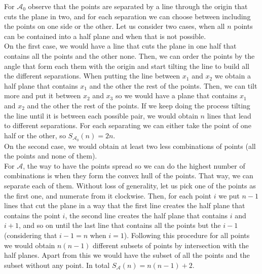 \documentclass[11pt, english]{article}
\begin{document}
For $\mathcal{A}_0$ observe that the points are separated by a line through the origin that cuts the plane in two, and for each separation we can choose between including the points on one side or the other. Let us consider two cases, when all $n$ points can be contained into a half plane and when that is not possible.\\

On the first case, we would have a line that cuts the plane in one half that contains all the points and the other none. Then, we can order the points by the angle that form each them with the origin and start tilting the line to build all the different separations. When putting the line between $x_1$ and $x_2$ we obtain a half plane that contains $x_1$  and the other the rest of the points. Then, we can tilt more and put it between $x_2$ and $x_3$ so we would have a plane that contains $x_1$ and $x_2$ and the other the rest of the points. If we keep doing the process tilting the line until it is between each possible pair, we would obtain $n$ lines that lead to different separations. For each separating we can either take the point of one half or the other, so $S_{\mathcal{A}_0}(n)=2n$.\\
On the second case, we would obtain at least two less combinations of points (all the points and none of them).\\

For $\mathcal{A}$, the way to have the points spread so we can do the highest number of combinations is when they form the convex hull of the points. That way, we can separate each of them. Without loss of generality, let us pick one of the points as the first one, and numerate from it clockwise. Then, for each point $i$ we put $n-1$ lines that cut the plane in a way that the first line creates the half plane that contains the point $i$, the second line creates the half plane that contains $i$ and $i+1$, and so on until the last line that contains all the points but the $i-1$ (considering that $i-1=n$ when $i=1$). Following this procedure for all points we would obtain $n(n-1)$ different subsets of points by intersection with the half planes. Apart from this we would have the subset of all the points and the subset without any point. In total $S_{\mathcal{A}}(n)=n(n-1)+2$.
\newpage
\end{document}
